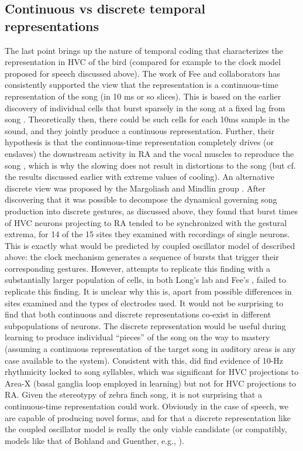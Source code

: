 \documentclass[output=paper,
modfonts
]{LSP/langsci}
\begin{document}
\subsection{Continuous vs discrete temporal representations}
The last point brings up the nature of temporal coding that characterizes the representation in HVC of the bird (compared for example to the clock model proposed for speech discussed above). The work of Fee and collaborators has consistently supported the view that the representation is a continuous-time representation of the song (in 10 ms or so slices). This is based on the earlier discovery  \citep{Hahnloser2002}
of individual cells that burst sparsely in the song at a fixed lag from song . Theoretically then, there could be such cells for each 10ms sample in the sound, and they jointly produce a continuous representation. Further, their hypothesis is that the continuous-time representation completely drives (or enslaves) the downstream activity in RA and the vocal muscles to reproduce the song \citep{Long2008}, which is why the slowing does not result in distortions to the song (but cf. the results discussed earlier with extreme values of cooling). An alternative discrete view was proposed by the Margoliash and Mindlin group \citep{Amador2013}. After discovering that it was possible to decompose the dynamical  governing song production into discrete gestures, as discussed above, they found that burst times of HVC neurons projecting to RA tended to be synchronized with the gestural extrema, for 14 of the 15 sites they examined with recordings of single neurons. This is exactly what would be predicted by coupled oscillator model of  described above: the clock mechanism generates a sequence of bursts that trigger their corresponding gestures. However, attempts to replicate this finding with a substantially larger population of cells, in both Long's lab \citep{Picardo2016} and Fee's \citep{Lynch2016}, failed to replicate this finding. It is unclear why this is, apart from possible differences in sites examined and the types of electrodes used. It would not be surprising to find that both continuous and discrete representations co-exist in different subpopulations of neurons. The discrete representation would be useful during learning to produce individual ``pieces'' of the song on the way to mastery (assuming a continuous representation of the target song in auditory areas is any case available to the system). Consistent with this, \cite{Lynch2016} did find evidence of 10-Hz rhythmicity locked to song syllables, which was significant for HVC projections to Area-X (basal ganglia loop employed in learning) but not for HVC projections to RA. Given the stereotypy of zebra finch song, it is not surprising that a continuous-time representation could work. Obviously in the case of speech, we are capable of producing novel forms, and for that a discrete representation like the coupled oscillator model is really the only viable candidate (or compatibly,  models like that of Bohland and Guenther, e.g., \citealt{Bohland2010}).
\end{document}
